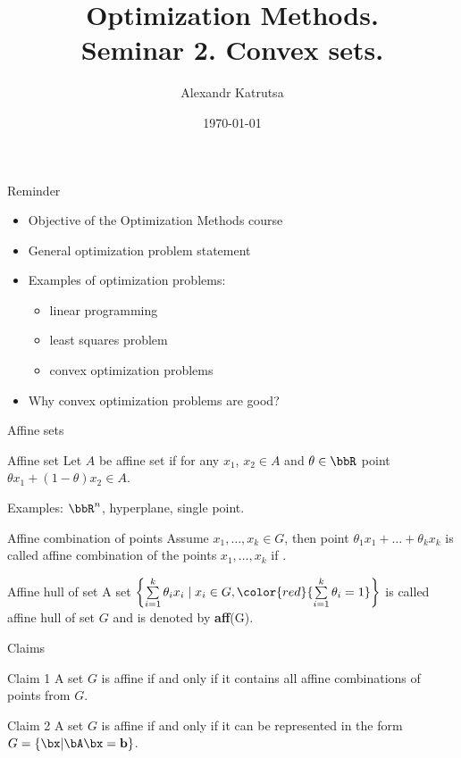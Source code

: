 \documentclass[12pt,russian]{beamer}
\title[Seminar 2]{Optimization Methods. \\
Seminar 2. Convex sets.}
\author{Alexandr Katrutsa}
\institute{Moscow Institute of Physics and Technology,\\
Department of Control and Applied Mathematics}
\date{\today}
\begin{document}
\begin{frame}
\maketitle
\end{frame}

\begin{frame}{Reminder}

\begin{itemize}
\item Objective of the Optimization Methods course
\item General optimization problem statement
\item Examples of optimization problems: 
\begin{itemize}
\item linear programming
\item least squares problem
\item convex optimization problems
\end{itemize}
\item Why convex optimization problems are good?
\end{itemize}
\end{frame}

\begin{frame}{Affine sets}
\small
\begin{block}{Affine set}
Let $A$ be affine set if for any $x_1$, $x_2 \in A$ and $\theta \in \bbR$ point $\theta x_1 + (1 - \theta)x_2 \in A$.
\end{block}
Examples: $\bbR^n$, hyperplane, single point.

\begin{block}{Affine combination of points}
Assume $x_1, \ldots, x_k \in G$, then point $\theta_1 x_1 + \ldots + \theta_k x_k$ is called affine combination of the points $x_1,\ldots,x_k$ if {}.
\end{block}

\begin{block}{Affine hull of set}
A set $\left\{ \sum\limits_{i=1}^k \theta_i x_i \; | \; x_i \in G, {\color{red}{\sum\limits_{i=1}^k \theta_i = 1}} \right\}$ is called affine hull of set $G$ and is denoted by \textbf{aff}(G).
\end{block}
\end{frame}

\begin{frame}{Claims}

\begin{block}{Claim 1}
A set $G$ is affine if and only if it contains all affine combinations of points from $G$.
\end{block}

\begin{block}{Claim 2}
A set $G$ is affine if and only if it can be represented in the form  $G = \{\bx | \bA\bx = \mathbf{b} \}$.
\end{block}
\end{frame}
\end{document}
